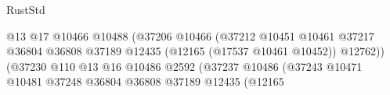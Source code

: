 \begin{lexlean}{RustStd}
\begin{coremodule}
                                                                  @13
                                                                  @17
                                                                  @10466
                                                                  @10488
                                                                  (@37206
                                                                    @10466
                                                                    (@37212
                                                                      @10451
                                                                      @10461
                                                                      @37217
                                                                      @36804
                                                                      @36808
                                                                      @37189
                                                                      @12435
                                                                      (@12165
                                                                        (@17537 @10461 @10452))
                                                                      @12762))
                                                                  (@37230
                                                                    @110
                                                                    @13
                                                                    @16
                                                                    @10486
                                                                    @2592
                                                                    (@37237
                                                                      @10486
                                                                      (@37243
                                                                        @10471
                                                                        @10481
                                                                        @37248
                                                                        @36804
                                                                        @36808
                                                                        @37189
                                                                        @12435
                                                                        (@12165

\end{coremodule}
\end{lexlean}
